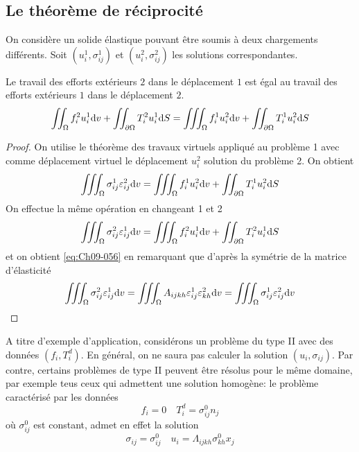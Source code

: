 \subsection{Le théorème de réciprocité} \label{ssec:Ch09-2.1}
On considère un solide élastique pouvant être soumis à deux chargements différents.
Soit $\left( u_i^1, \sigma_{ij}^1 \right)$ et $\left( u_i^2, \sigma_{ij}^2 \right)$ les solutions correspondantes.

\begin{thm}
    Le travail des efforts extérieurs $2$ dans le déplacement $1$ est égal au travail des efforts extérieurs $1$ dans le déplacement $2$.
    \begin{equation}
        \iint_{\Omega} f_i^2 u_i^1 \mathrm{d} v + \iint_{\partial \Omega} T_i^2 u_i^1 \mathrm{d} S = \iiint_{\Omega} f_i^1 u_i^2 \mathrm{d} v + \iint_{\partial \Omega} T_i^1 u_i^2 \mathrm{d} S
        \label{eq:Ch09-056}
    \end{equation}
\end{thm}
\begin{proof}
    On utilise le théorème des travaux virtuels appliqué au problème 1 avec comme déplacement virtuel le déplacement $u_i^2$ solution du problème 2. 
    On obtient
    \begin{displaymath}
        \iiint_{\Omega} \sigma_{ij}^1 \varepsilon_{ij}^2 \mathrm{d} v = \iiint_{\Omega} f_i^1 u_i^2 \mathrm{d} v + \iint_{\partial \Omega} T_i^1 u_i^2 \mathrm{d} S
    \end{displaymath}
    On effectue la même opération en changeant 1 et 2 
    \begin{displaymath}
        \iiint_{\Omega} \sigma_{ij}^2 \varepsilon_{ij}^1 \mathrm{d} v = \iiint_{\Omega} f_i^2 u_i^1 \mathrm{d} v + \iint_{\partial \Omega} T_i^2 u_i^1 \mathrm{d} S
    \end{displaymath}
    et on obtient \eqref{eq:Ch09-056} en remarquant que d'après la symétrie de la matrice d'élasticité 
    \begin{displaymath}
        \iiint_{\Omega} \sigma_{ij}^2 \varepsilon_{ij}^1 \mathrm{d} v = \iiint_{\Omega} A_{ijkh} \varepsilon_{ij}^1 \varepsilon_{kh}^2 \mathrm{d} v = \iiint_{\Omega} \sigma_{ij}^1 \varepsilon_{ij}^2 \mathrm{d} v
    \end{displaymath}
\end{proof}

A titre d'exemple d'application, considérons un problème du type II avec des données $\left( f_i, T_i^d \right)$.
En général, on ne saura pas calculer la solution $\left( u_i, \sigma_{ij} \right)$.
Par contre, certains problèmes de type II peuvent être résolus pour le même domaine, par exemple teus ceux qui admettent une solution homogène: le problème caractérisé par les données 
\begin{equation}
    f_i = 0 \quad T_i^d = \sigma_{ij}^0 n_j
    \label{eq:Ch09-057}
\end{equation}
où $\sigma_{ij}^0$ est constant, admet en effet la solution 
\begin{equation}
    \sigma_{ij} = \sigma_{ij}^0 \quad u_i = \Lambda_{ijkh} \sigma_{kh}^0 x_j
    \label{eq:Ch09-058}
\end{equation}

